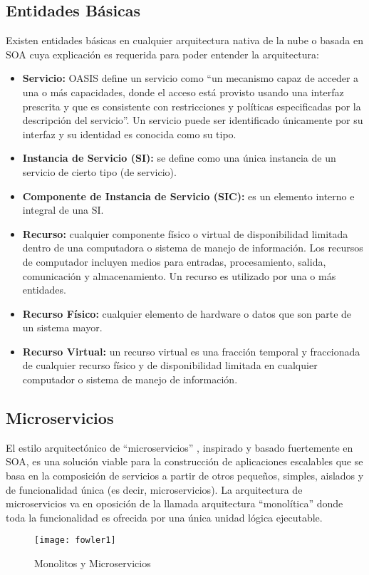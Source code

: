         \subsection{Entidades Básicas}
        Existen entidades básicas en cualquier arquitectura nativa de la nube o basada en SOA cuya explicación es requerida para poder entender la arquitectura:
        \begin{itemize}
            \item \textbf{Servicio:} OASIS define un servicio como  “un mecanismo capaz de acceder a una o más capacidades, donde el acceso está provisto usando una interfaz prescrita y que es consistente con restricciones y políticas especificadas por la descripción del servicio”. Un servicio puede ser identificado únicamente por su interfaz y su identidad es conocida como su tipo. 
            \item \textbf{Instancia de Servicio (SI):} se define como una única instancia de un servicio de cierto tipo (de servicio).
            \item \textbf{Componente de Instancia de Servicio (SIC):} es un elemento interno e integral de una SI.
            \item \textbf{Recurso:} cualquier componente físico o virtual de disponibilidad limitada dentro de una computadora o sistema de manejo de información. Los recursos de computador incluyen medios para entradas, procesamiento, salida, comunicación y almacenamiento. Un recurso es utilizado por una o más entidades.
            \item \textbf{Recurso Físico:} cualquier elemento de hardware o datos que son parte de un sistema mayor.
            \item \textbf{Recurso Virtual: }un recurso virtual es una fracción temporal y fraccionada de cualquier recurso físico y de disponibilidad limitada en cualquier computador o sistema de manejo de información.
        \end{itemize}
     
        \subsection{Microservicios}
        El estilo arquitectónico de “microservicios” \cite{Lewis2016-az}, inspirado y basado fuertemente en SOA, es una solución viable para la construcción de aplicaciones escalables que se basa en la composición de servicios a partir de otros pequeños, simples, aislados y de funcionalidad única (es decir, microservicios). La arquitectura de microservicios va en oposición de la llamada arquitectura “monolítica” donde toda la funcionalidad es ofrecida por una única unidad lógica ejecutable.
        \begin{figure}[ht]
            \centering
            \texttt{[image: fowler1]}
            \caption{Monolitos y Microservicios \protect\cite{Lewis2016-az}}
            \label{fig:fowler1}
        \end{figure}
    
